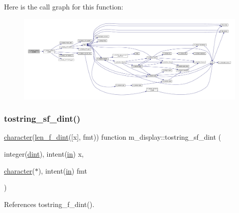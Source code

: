 Here is the call graph for this function\+:
\nopagebreak
\begin{figure}[H]
\begin{center}
\leavevmode
\includegraphics[width=350pt]{namespacem__display_a41a473fe1569b4f3b44cc3f9b1f5b1ce_cgraph}
\end{center}
\end{figure}
\mbox{\label{namespacem__display_aa7d1fb61fc22bddb9232eaa13aaaa43f}} 
\subsubsection{\texorpdfstring{tostring\+\_\+sf\+\_\+dint()}{tostring\_sf\_dint()}}
{\footnotesize\ttfamily \hyperlink{option__stopwatch_83_8txt_abd4b21fbbd175834027b5224bfe97e66}{character}(\hyperlink{namespacem__display_a6a2709cf5f243ee492f223b40c6b5143}{len\+\_\+f\+\_\+dint}(\mbox{[}x\mbox{]}, fmt)) function m\+\_\+display\+::tostring\+\_\+sf\+\_\+dint (\begin{DoxyParamCaption}\item[{integer(\hyperlink{namespacem__display_a73f772e9702cad6f40b78364fde2c7cd}{dint}), intent(\hyperlink{M__journal_83_8txt_afce72651d1eed785a2132bee863b2f38}{in})}]{x,  }\item[{\hyperlink{option__stopwatch_83_8txt_abd4b21fbbd175834027b5224bfe97e66}{character}($\ast$), intent(\hyperlink{M__journal_83_8txt_afce72651d1eed785a2132bee863b2f38}{in})}]{fmt }\end{DoxyParamCaption})\hspace{0.3cm}{\ttfamily [private]}}



References tostring\+\_\+f\+\_\+dint().

